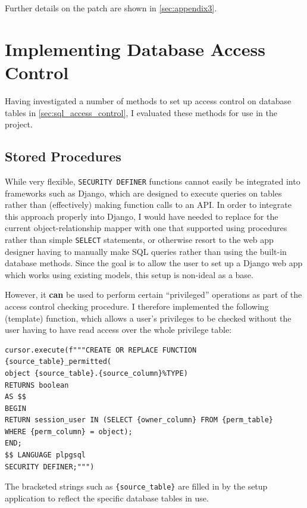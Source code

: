 \documentclass[12pt]{report}
\begin{document}
Further details on the patch are shown in \autoref{sec:appendix3}.

\section{Implementing Database Access Control}
\label{sec:implementing_database_access_control}
Having investigated a number of methods to set up access control on database tables in \autoref{sec:sql_access_control}, I evaluated these methods for use in the project.

\subsection{Stored Procedures}
While very flexible, \texttt{SECURITY DEFINER} functions cannot easily be integrated into frameworks such as Django, which are designed to execute queries on tables rather than (effectively) making function calls to an API. In order to integrate this approach properly into Django, I would have needed to replace for the current object-relationship mapper with one that supported using procedures rather than simple \texttt{SELECT} statements, or otherwise resort to the web app designer having to manually make SQL queries rather than using the built-in database methods. Since the goal is to allow the user to set up a Django web app which works using existing models, this setup is non-ideal as a base.

However, it \textbf{can} be used to perform certain ``privileged'' operations as part of the access control checking procedure. I therefore implemented the following (template) function, which allows a user's privileges to be checked without the user having to have read access over the whole privilege table:

\begin{verbatim}
cursor.execute(f"""CREATE OR REPLACE FUNCTION {source_table}_permitted(
object {source_table}.{source_column}%TYPE)
RETURNS boolean
AS $$
BEGIN
RETURN session_user IN (SELECT {owner_column} FROM {perm_table}
WHERE {perm_column} = object);
END;
$$ LANGUAGE plpgsql
SECURITY DEFINER;""")
\end{verbatim}

The bracketed strings such as \verb+{source_table}+ are filled in by the setup application to reflect the specific database tables in use.
\end{document}
